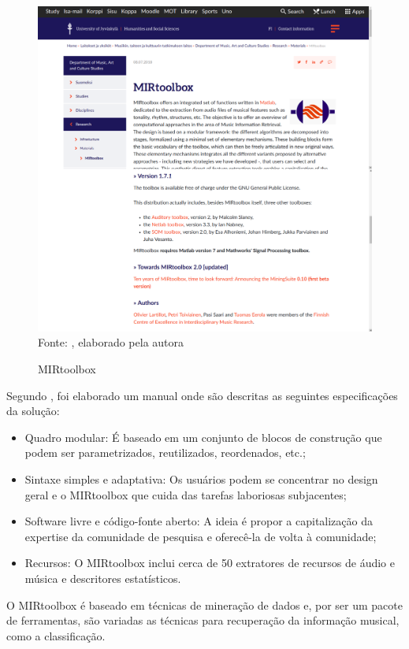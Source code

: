 \begin{figure}[!htb]
   \centering
   \caption{MIRtoolbox}\label{fig:mirtoolbox} 
   \includegraphics[scale=0.2]{figuras/mirtoolbox.png}
   \\Fonte: \cite{mirtoolbox}, elaborado pela autora
\end{figure}

Segundo \cite{lartillot2013}, foi elaborado um manual onde são descritas as seguintes especificações da solução:

\begin{itemize}
    \item Quadro modular: É baseado em um conjunto de blocos de construção que podem ser parametrizados, reutilizados, reordenados, etc.;
    \item Sintaxe simples e adaptativa: Os usuários podem se concentrar no design geral e o MIRtoolbox que cuida das tarefas laboriosas subjacentes;
    \item Software livre e código-fonte aberto: A ideia é propor a capitalização da expertise da comunidade de pesquisa e oferecê-la de volta à comunidade;
    \item Recursos: O MIRtoolbox inclui cerca de 50 extratores de recursos de áudio e música e descritores estatísticos.
\end{itemize}

O MIRtoolbox é baseado em técnicas de mineração de dados e, por ser um pacote de ferramentas, são variadas as técnicas para recuperação da informação musical, como a classificação.

